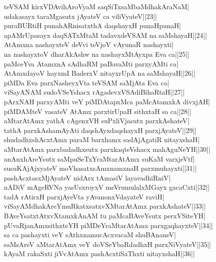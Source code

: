 \documentclass{article}
\begin{document}
teVSAM kirxVDAvihAroVyaM saqSiTxsaMbaMdhakAraNaM|\\
udakasayx taraMgasutx jAyateV ca viliVyateV||23||\\
puraBURtiH punahARnisatxthA daqshayxH punaHpunaH|\\
apAMrUpasayx daqSATxMtaM tadavxdeVSAM na saMshayaH||24||\\
AtAmxna nashayxteV deVvi teVjoV vAyunaR nashayxti|\\
na nashayxtoV dharAkAshw na nashayxMtAyxpa Eva ca||25||\\
paMceYva AtamxnA sAdhaRM paBavaMti parxyAMti ca|\\
AtAmxdayoV hayxmI BaderxV nitayxrUpA na saMshayaH||26||\\
piMDa Eva parxNasheyxVta teVSAM saMjAta Eva ca|\\
viSayANAM sudoVSeYshacx rAgadevxVSAdiBihaRtaH||27||\\
pArxNAH parxyAMti veY piMDAtapxMca paMcAtamxkA divxjAH|\\
piMDAMteV vasateV AtAmx parxtirUpaH sithxtaH sa ca||28||\\
aMtarAtAmx yathA cAgenxVH suPxliVjasutx parxkAshateV|\\
tathA parxkAshamAyAti daqshAyxdaqshayxH parxjAyateV||29||\\
shudadhxshAcxtAmx paraM barxhamx sadAjAgatiR nitayxshaH|\\
aMtarAtAmx parxbadadhxsutx parxkaqteVshacx mahAguNeYH||30||\\
anAnxhAreYsutx saMpuSeTxYraMtarAtAmx suKaM varxjeVtf|\\
susuKAjAjxyateV moVhasatxsAmxnamxnaH parxmuhayxti||31||\\
pashAcxtasxMjAyateV nidArx tAmasiV layavadhiRniV|\\
nADiV mAgeRVNa yasUsxroyxV meVrumulalxMGayx gacaCxti||32||\\
tadA rAtirxH parxjAyeVta yAvanonxVdayateV raviH|\\
viSayAMdhakAreYmuRkatxsatxvXMtarAtAmx parxkAshateV||33||\\
BAveYsatxtAtxvXtamxkAnAM tu paMcaBAveYsutx perxVSiteYH|\\
pUvaRjanAmxsithxteYH piMDeYraMtarAtAmx parxgaqhayxteV||34||\\
sa ca pashayxti veY sAthxnamucAcxvacaM shuBAnaneV|\\
saMsAreV aMtarAtAmx veY doVSeYbaRdadhxH parxNiVyateV||35||\\
kAyaM rakaSxti jiVvAtAmx pashAcxtiSaThxti nitayxshaH||36||\\
\end{document}
